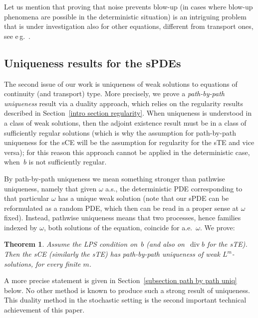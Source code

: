 \documentclass[a4paper,10pt]{article}
\newtheorem{theorem}{Theorem}[section]
\newcommand\1{\mathbbm{1}}
\DeclareMathOperator{\diverg}{div}
\numberwithin{equation}{section}
\begin{document}
Let us mention that proving that noise prevents blow-up (in cases where  blow-up phenomena are possible in the deterministic situation) is an intriguing
problem that is under investigation also for other equations, different from
transport ones, see e\,g.\ \cite{CHOGUB13,DEBTSU11,DeFlVi,FLAGUBPRI10a,FlMaNe}.

\subsection{Uniqueness results for the sPDEs\label{intro section uniqueness}}

The second issue of our work is uniqueness of weak solutions to equations of continuity (and transport) type. More precisely, we prove a \textit{path-by-path uniqueness} result via a duality approach, which relies on the regularity results described in Section~\ref{intro section regularity}. When uniqueness is understood in a class of weak solutions, then the adjoint existence result must be in a class of sufficiently regular solutions (which is why the assumption for path-by-path uniqueness for the sCE will be the assumption for regularity for the sTE and vice versa); for this reason this approach cannot be applied in the deterministic case, when~$b$ is not sufficiently regular.

By path-by-path uniqueness we mean something stronger than pathwise uniqueness, namely that given $\omega $ a.s., the deterministic PDE
corresponding to that particular $\omega $ has a unique weak solution (note that our sPDE can be reformulated as a random PDE, which then can be read in a proper sense at $\omega$ fixed). Instead, pathwise uniqueness means that two processes, hence families indexed by $\omega $, both solutions of the equation, coincide for a.e.~$\omega $. We prove:

\begin{theorem}
Assume the LPS condition on~$b$ \textup{(}and also on~$\diverg b$ for the sTE\textup{)}. Then the sCE \textup{(}similarly the sTE\textup{)} has path-by-path uniqueness of weak $L^{m}$-solutions, for every finite $m$.
\end{theorem}

A more precise statement is given in Section~\ref{subsection path by path uniq} below. No other method is known to produce such a strong result of uniqueness. This duality method in the stochastic setting is the second important technical achievement of this paper.
\end{document}
